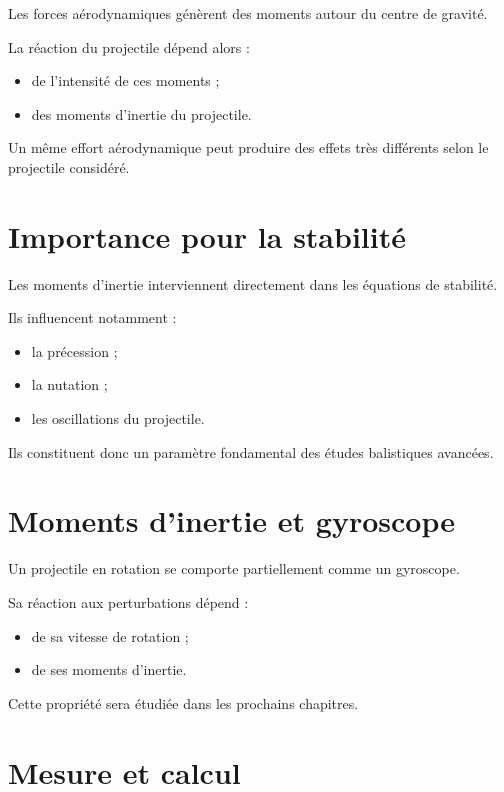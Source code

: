 Les forces aérodynamiques génèrent des moments autour du centre de gravité.

La réaction du projectile dépend alors :

\begin{itemize}
    \item de l'intensité de ces moments ;
    \item des moments d'inertie du projectile.
\end{itemize}

Un même effort aérodynamique peut produire des effets très différents selon
le projectile considéré.

\section{Importance pour la stabilité}

Les moments d'inertie interviennent directement dans les équations de
stabilité.

Ils influencent notamment :

\begin{itemize}
    \item la précession ;
    \item la nutation ;
    \item les oscillations du projectile.
\end{itemize}

Ils constituent donc un paramètre fondamental des études balistiques
avancées.

\section{Moments d'inertie et gyroscope}

Un projectile en rotation se comporte partiellement comme un gyroscope.

Sa réaction aux perturbations dépend :

\begin{itemize}
    \item de sa vitesse de rotation ;
    \item de ses moments d'inertie.
\end{itemize}

Cette propriété sera étudiée dans les prochains chapitres.

\section{Mesure et calcul}

